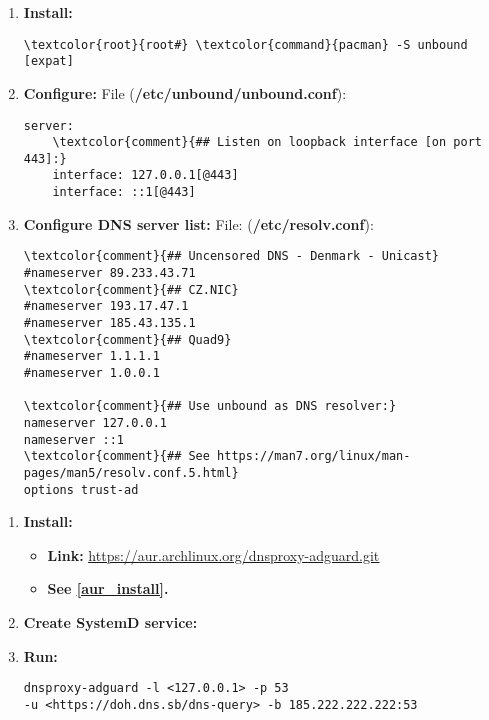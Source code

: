 \documentclass[10pt, a4paper, onecolumn, openany]{book} %
\begin{document}
\begin{enumerate}
    \item \textbf{Install:}
\begin{Verbatim}[commandchars=\\\{\}]
\textcolor{root}{root#} \textcolor{command}{pacman} -S unbound [expat]
\end{Verbatim}
    \item \textbf{Configure:}
\newline File (\textcolor{file}{\textbf{/etc/unbound/unbound.conf}}):
\begin{Verbatim}[commandchars=\\\{\}]
server:
    \textcolor{comment}{## Listen on loopback interface [on port 443]:}
    interface: 127.0.0.1[@443]
    interface: ::1[@443]
\end{Verbatim}

    \item \textbf{Configure DNS server list:}
\newline File: (\textbf{\textcolor{file}{/etc/resolv.conf}}):
\begin{Verbatim}[commandchars=\\\{\}]
\textcolor{comment}{## Uncensored DNS - Denmark - Unicast}
#nameserver 89.233.43.71
\textcolor{comment}{## CZ.NIC}
#nameserver 193.17.47.1
#nameserver 185.43.135.1
\textcolor{comment}{## Quad9}
#nameserver 1.1.1.1
#nameserver 1.0.0.1

\textcolor{comment}{## Use unbound as DNS resolver:}
nameserver 127.0.0.1
nameserver ::1
\textcolor{comment}{## See https://man7.org/linux/man-pages/man5/resolv.conf.5.html}
options trust-ad
\end{Verbatim}

\end{enumerate}



\begin{enumerate}
    \item \textbf{Install:}
    \begin{itemize}
        \item \textbf{Link:} \underline{\href{https://aur.archlinux.org/dnsproxy-adguard.git}{https://aur.archlinux.org/dnsproxy-adguard.git}}
        \item \textbf{See \underline{\ref{aur_install}}.}
    \end{itemize}
    \item \textbf{Create SystemD service:}

    \item \textbf{Run:}
\begin{Verbatim}[commandchars=\\\{\}]
dnsproxy-adguard -l <127.0.0.1> -p 53 
-u <https://doh.dns.sb/dns-query> -b 185.222.222.222:53
\end{Verbatim} 

\end{enumerate}
\end{document}
